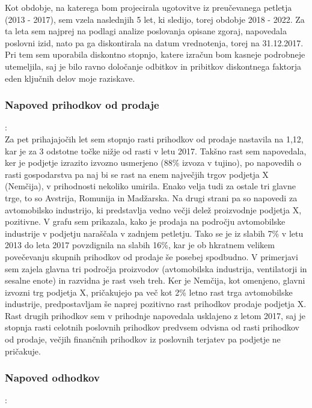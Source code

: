 \documentclass[12pt,a4paper]{amsart}
\theoremstyle{definition} %
\theoremstyle{plain} %
\begin{document}
Kot obdobje, na katerega bom projecirala ugotovitve iz preučevanega petletja (2013 - 2017), sem vzela naslednjih 5 let, ki sledijo, torej obdobje 2018 - 2022. Za ta leta sem najprej na podlagi analize poslovanja opisane zgoraj, napovedala poslovni izid, nato pa ga diskontirala na datum vrednotenja, torej na 31.12.2017. Pri tem sem uporabila diskontno stopnjo, katere izračun bom kasneje podrobneje utemeljila, saj je bilo ravno določanje odbitkov in pribitkov diskontnega faktorja eden ključnih delov moje raziskave.\\

\subsubsection{Napoved prihodkov od prodaje}:\\

Za pet prihajajočih let sem stopnjo rasti prihodkov od prodaje nastavila na 1,12, kar je za 3 odstotne točke nižje od rasti v letu 2017. Takšno rast sem napovedala, ker je podjetje izrazito izvozno usmerjeno (88\% izvoza v tujino), po napovedih o rasti gospodarstva pa naj bi se rast na enem največjih trgov podjetja X (Nemčija), v prihodnosti nekoliko umirila. Enako velja tudi za ostale tri glavne trge, to so Avstrija, Romunija in Madžarska. Na drugi strani pa so napovedi za avtomobilsko industrijo, ki predstavlja vedno večji delež proizvodnje podjetja X, pozitivne. V grafu sem prikazala, kako je prodaja na področju avtomobilske industrije v podjetju naraščala v zadnjem petletju. Tako se je iz slabih 7\% v letu 2013 do leta 2017 povzdignila na slabih 16\%, kar je ob hkratnem velikem povečevanju skupnih prihodkov od prodaje še posebej spodbudno. V primerjavi sem zajela glavna tri področja proizvodov (avtomobilska industrija, ventilatorji in sesalne enote) in razvidna je rast vseh treh. Ker je Nemčija, kot omenjeno, glavni izvozni trg podjetja X, pričakujejo pa več kot 2\% letno rast trga avtomobilske industrije, predpostavljam še naprej pozitivno rast prihodkov prodaje podjetja X. Rast drugih prihodkov sem v prihodnje napovedala usklajeno z letom 2017, saj je stopnja rasti celotnih poslovnih prihodkov predvsem odvisna od rasti prihodkov od prodaje, večjih finančnih prihodkov iz poslovnih terjatev pa podjetje ne pričakuje.\\


\subsubsection{Napoved odhodkov}:\\
\end{document}
